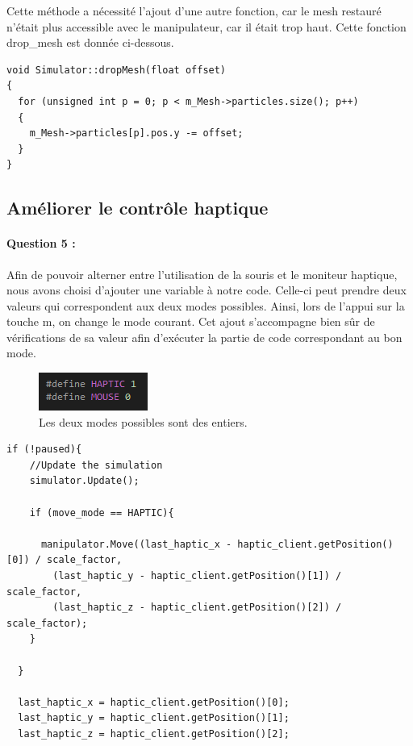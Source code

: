 \documentclass[a4paper,12pt]{article}
\begin{document}
Cette méthode a nécessité l'ajout d'une autre fonction, car le mesh restauré n'était plus accessible avec le manipulateur, car il était trop haut. Cette fonction \og{}drop\_mesh\fg{} est donnée ci-dessous.
\begin{lstlisting}
void Simulator::dropMesh(float offset)
{
  for (unsigned int p = 0; p < m_Mesh->particles.size(); p++)
  {
    m_Mesh->particles[p].pos.y -= offset;
  }
}
\end{lstlisting}

\subsection{Améliorer le contrôle haptique}
\paragraph{Question 5 :} Afin de pouvoir alterner entre l'utilisation de la souris et le moniteur haptique, nous avons choisi d'ajouter une variable à notre code. Celle-ci peut prendre deux valeurs qui correspondent aux deux modes possibles. Ainsi, lors de l'appui sur la touche \og{}m\fg{}, on change le mode courant. Cet ajout s'accompagne bien sûr de vérifications de sa valeur afin d'exécuter la partie de code correspondant au bon mode.
\begin{figure}[ht!]
  \centering
  \includegraphics{images/modes.png}
  \caption{Les deux modes possibles sont des entiers.}
  \label{fig:modes}
\end{figure}

\newpage\begin{lstlisting}
if (!paused){
    //Update the simulation
    simulator.Update();

    if (move_mode == HAPTIC){

      manipulator.Move((last_haptic_x - haptic_client.getPosition()[0]) / scale_factor,
        (last_haptic_y - haptic_client.getPosition()[1]) / scale_factor,
        (last_haptic_z - haptic_client.getPosition()[2]) / scale_factor);
    }
    
  }

  last_haptic_x = haptic_client.getPosition()[0];
  last_haptic_y = haptic_client.getPosition()[1];
  last_haptic_z = haptic_client.getPosition()[2];
\end{lstlisting}
\end{document}
